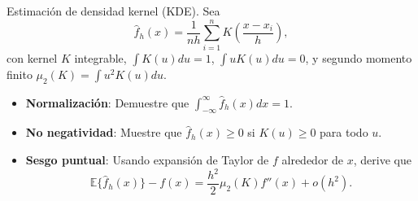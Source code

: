 \documentclass[a4paper,11pt]{article}
\begin{document}
\newpage
\begin{ejercicio}{13}
    Estimación de densidad kernel (KDE). Sea
    \[
        \hat{f}_{h}(x) = \frac{1}{nh} \sum_{i=1}^{n} K\left(\frac{x-x_i}{h}\right),
    \]
    con kernel $K$ integrable, $\int K(u) du = 1$, $\int uK(u) du = 0$, y segundo momento finito $\mu_2(K) = \int u^2 K(u) du$.

    \begin{itemize}
        \item \textbf{Normalización}: Demuestre que $\int_{-\infty}^{\infty} \hat{f}_{h}(x) dx = 1$.
        \item \textbf{No negatividad}: Muestre que $\hat{f}_{h}(x) \geq 0$ si $K(u) \geq 0$ para todo $u$.
        \item \textbf{Sesgo puntual}: Usando expansión de Taylor de $f$ alrededor de $x$, derive que
              \[
                  \mathbb{E}\{\hat{f}_{h}(x)\} - f(x) = \frac{h^2}{2} \mu_2(K) f''(x) + o(h^2).
              \]
    \end{itemize}
\end{ejercicio}
\end{document}
